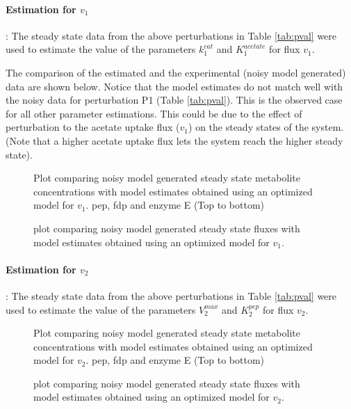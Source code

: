 \documentclass[10pt]{report}
\begin{document}
	\paragraph{Estimation for $v_1$}: The steady state data from the above perturbations in Table \ref{tab:pval} were used to estimate the value of the parameters $k_1^{cat}$ and $K_1^{acetate}$ for flux $v_1$.
	
	The comparison of the estimated and the experimental (noisy model generated) data are shown below. Notice that the model estimates do not match well with the noisy data for perturbation P1 (Table \ref{tab:pval}). This is the observed case for all other parameter estimations. This could be due to the effect of perturbation to the acetate uptake flux ($v_1$) on the steady states of the system. (Note that a higher acetate uptake flux lets the system reach the higher steady state).
	
	\begin{figure}[!tbhp]
		\caption{Plot comparing noisy model generated steady state metabolite concentrations with model estimates obtained using an optimized model for $v_1$. pep, fdp and enzyme E (Top to bottom)}
	\end{figure}
	\begin{figure}[!tbhp]
		\caption{plot comparing noisy model generated steady state fluxes with model estimates obtained using an optimized model for $v_1$.}
	\end{figure}
	\clearpage

	\paragraph{Estimation for $v_2$}: The steady state data from the above perturbations in Table \ref{tab:pval} were used to estimate the value of the parameters $V_2^{max}$ and $K_2^{pep}$ for flux $v_2$.
		
	\begin{figure}[!tbhp]
		\caption{Plot comparing noisy model generated steady state metabolite concentrations with model estimates obtained using an optimized model for $v_2$. pep, fdp and enzyme E (Top to bottom)}
	\end{figure}
	\begin{figure}[!tbhp]
		\caption{plot comparing noisy model generated steady state fluxes with model estimates obtained using an optimized model for $v_2$.}
	\end{figure}
\end{document}

